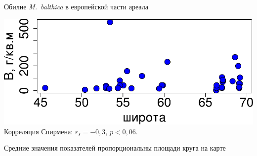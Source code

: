 \documentclass{beamer}
\begin{document}
\begin{frame}{Обилие {\it M.~balthica} в европейской части ареала}
\begin{minipage}[t]{.49\linewidth}
\begin{center}
			\includegraphics[width=\textwidth]{lat_vs_Bmean_big1.pdf}\\
{\small Корреляция Спирмена: $r_{s} = -0,3$, $p < 0,06$.}
		\end{center}
	\end{minipage}

{\tiny Средние значения показателей пропорциональны площади круга на карте}
\end{frame}



\end{document}
